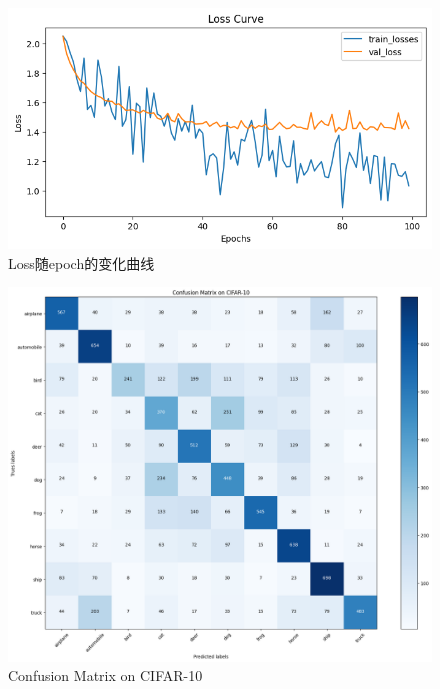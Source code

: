 \documentclass[12pt]{article}
\begin{document}
\begin{figure}[htbp]
  \centering
  \includegraphics[scale=0.75]{figures/nn/loss_curve.png}
  \caption{Loss随epoch的变化曲线}
  \label{fig:loss_curve}
\end{figure}


\begin{figure}[htbp]
  \centering
  \includegraphics[scale=0.5]{figures/nn/confusion_matrix.png}
  \caption{Confusion Matrix on CIFAR-10}
  \label{fig:confusion_matrix}
\end{figure}
\end{document}
